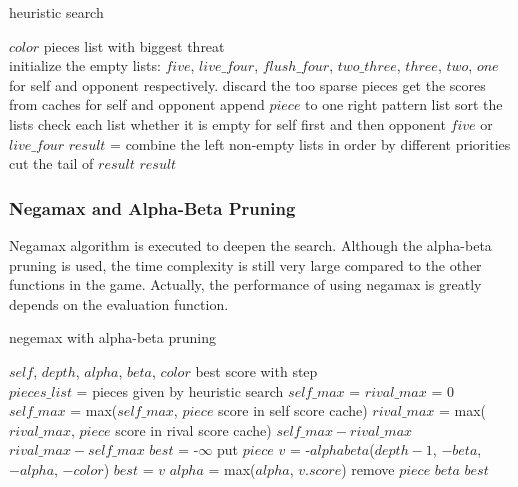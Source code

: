 \documentclass[conference,compsoc]{IEEEtran}
\renewcommand{\algorithmicrequire}{\textbf{Input:}}
\renewcommand{\algorithmicensure}{\textbf{Output:}}
\begin{document}
\begin{algorithm}
 \caption{heuristic search}
 \begin{algorithmic}[h]
 \renewcommand{\algorithmicrequire}{\textbf{Input:}}
 \renewcommand{\algorithmicensure}{\textbf{Output:}}
 \REQUIRE $color$
 \ENSURE  pieces list with biggest threat\\
 \STATE initialize the empty lists: $five$, $live\_four$, $flush\_four$, $two\_three$, $three$, $two$, $one$ for self and opponent respectively.
 \STATE discard the too sparse pieces 
 \STATE get the scores from caches for self and opponent
 \STATE append $piece$ to one right pattern list
 \ENDFOR
 \STATE sort the lists
 \STATE check each list whether it is empty for self first and then opponent
 \RETURN $five$ or $live\_four$
 \ENDIF
 \STATE $result$ = combine the left non-empty lists in order by different priorities
 \STATE cut the tail of $result$ 
 \ENDIF
 \RETURN $result$
 \end{algorithmic} 
 \end{algorithm}

\subsubsection{Negamax and Alpha-Beta Pruning}
Negamax algorithm is executed to deepen the search. Although the alpha-beta pruning is used, the time complexity is still very large compared to the other functions in the game. Actually, the performance of using negamax is greatly depends on the evaluation function.  

\begin{algorithm}
 \caption{negemax with alpha-beta pruning}
 \begin{algorithmic}[h]
 \renewcommand{\algorithmicrequire}{\textbf{Input:}}
 \renewcommand{\algorithmicensure}{\textbf{Output:}}
 \REQUIRE $self$, $depth$, $alpha$, $beta$, $color$
 \ENSURE  best score with step\\
  \STATE $pieces\_list$ = pieces given by heuristic search
  \STATE$self\_max$ = $rival\_max$ = $0$\\ 
  \STATE $self\_max$ = max($self\_max$, $piece$ score in self score cache)
  \STATE $rival\_max$ = max($rival\_max$, $piece$ score in rival score cache)
  \ENDFOR
  \RETURN $self\_max - rival\_max$
  \ELSE
  \RETURN $rival\_max - self\_max$
  \ENDIF
  \ENDIF  
  \STATE $best$ = -$\infty$
  \STATE put $piece$
  \STATE $v$ = -$alphabeta$($depth-1$, $-beta$, $-alpha$, $-color$)
  \STATE $best$ = $v$
  \ENDIF
  \STATE $alpha$ = max($alpha$, $v.score$)
  \STATE remove $piece$
  \RETURN $beta$
  \ENDIF
  \ENDFOR
 \RETURN $best$ 
 \end{algorithmic} 
 \end{algorithm}
\end{document}
